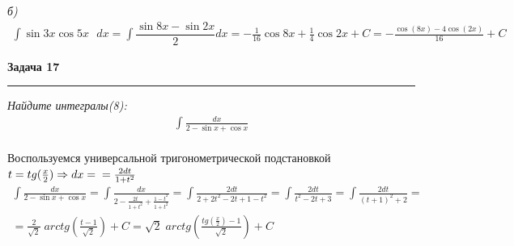 \documentclass[a4paper,11pt]{article}
\begin{document}
\noindent\textsl{б) }
\begin{gather*}
	\int \sin 3x \cos 5x \text{ }dx = \int \dfrac{\sin 8x - \sin 2x}{2}dx = -\frac1{16} \cos 8x + \frac14 \cos 2x + C = -\frac{\cos(8x) - 4\cos(2x)}{16} + C
\end{gather*}
\newpage







\textbf{\large Задача 17}
\medskip\hrule\medskip
\textsl{Найдите интегралы(8):}
\begin{align*}
	\int \frac{dx}{2 - \sin x + \cos x} 
\end{align*} \\

\noindent Воспользуемся универсальной тригонометрической подстановкой $ t = tg(\frac{x}2) \Rightarrow dx = \\  = \frac{2dt}{1 + t^2}$
\begin{gather*}
	\int \frac{dx}{2 - \sin x + \cos x} 
	= \int \frac{dx}{2 - \frac{2t}{1 + t^2} + \frac{1 - t^2}{1 + t^2}}
	= \int \frac{2dt}{2 + 2t^2 - 2t + 1 - t^2} 
	= \int \frac{2dt}{t^2 - 2t + 3} =  
	\int \frac{2dt}{(t + 1)^2 + 2} = \\
	= \frac{2}{\sqrt{2}}\;arctg(\frac{t - 1}{\sqrt{2}}) + C
	= \sqrt{2}\;arctg(\frac{tg(\frac{x}2) - 1}{\sqrt{2}}) + C
\end{gather*}
\\ \\ \\




\end{document}
